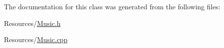 The documentation for this class was generated from the following files\-:\begin{DoxyCompactItemize}
\item 
Resources/\hyperlink{_music_8h}{Music.\-h}\item 
Resources/\hyperlink{_music_8cpp}{Music.\-cpp}\end{DoxyCompactItemize}
